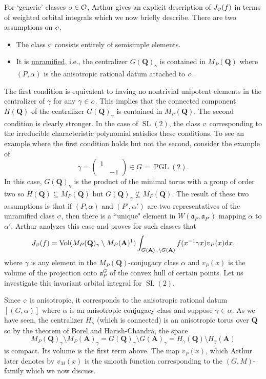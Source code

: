\documentclass[11pt]{amsart}
\def\A{\mathbf A}
\def\Q{\mathbf Q}
\def\O{\mathcal O}
\def\o{\scalebox{0.8}{$\scriptstyle\mathcal{O}$}}
\def\aaa{\mathfrak a}
\def\cb#1{{\color{black}#1}}
\def\d{\text d}
\def\bs{\setminus} 			%
\def\sl{\operatorname{SL}}
\def\vol{\operatorname{Vol}}
\theoremstyle{remark}
\begin{document}
For `generic' classes $\o \in \O$, Arthur gives an explicit description of $J_{\o}(f)$ in terms of weighted orbital integrals which we now briefly describe. There are two assumptions on $\o$. 
\begin{itemize}
	\item The class $\o$ consists entirely of semisimple elements. 
	\item It is \underline{unramified}, i.e., the centralizer $G(\Q)_\gamma$ is contained in $M_P(\Q)$ where $(P, \alpha)$ is the anisotropic rational datum attached to $\o$. 
\end{itemize}
The first condition is equivalent to having no nontrivial unipotent elements in the centralizer of $\gamma$ for any $\gamma \in \o$. This implies that the connected component $H(\Q)$ of the centralizer $G(\Q)_\gamma$ is contained in $M_P(\Q)$. The second condition is clearly stronger. 
\cb{
In the case of $\sl(2)$, the class $\o$ corresponding to the irreducible characteristic polynomial satisfies these conditions. To see an example where the first condition holds but not the second, consider the example of 
\[ \gamma = \begin{pmatrix} 1 & \\ & -1 \end{pmatrix} \in G = \operatorname{PGL}(2). \]
In this case, $G(\Q)_\gamma$ is the product of the minimal torus with a group of order two so $H(\Q) \subseteq M_P(\Q)$ but $G(\Q)_\gamma \not\subseteq M_P(\Q)$. 
}
The result of these two assumptions is that if $(P, \alpha)$ and $(P', \alpha')$ are two representatives of the unramified class $\o$, then there is a ``unique" element in $W(\aaa_P, \aaa_{P'})$ mapping $\alpha$ to $\alpha'$. Arthur analyzes this case and proves for such classes that
\begin{equation} \label{jo_anis}
	J_{\o}(f) = \vol(M_P(\Q)_\gamma \bs M_P(\A)^1) \int_{G(\A)_\gamma \bs G(\A)} f(x^{-1} \gamma x) v_P(x) \d x, 
\end{equation}
where $\gamma$ is any element in the $M_P(\Q)$-conjugacy class $\alpha$ and $v_P(x)$ is the volume of the projection onto $\aaa_P^G$ of the convex hull of certain points. Let us investigate this invariant orbital integral for $\sl(2)$. 

\cb{
Since $\o$ is anisotropic, it corresponds to the anisotropic rational datum $[(G, \alpha)]$ where $\alpha$ is an anisotropic conjugacy class and suppose $\gamma \in \alpha$. As we have seen, the centralizer $H_\gamma$ (which is connected) is an anisotropic torus over $\Q$ so by the theorem of Borel and Harish-Chandra, the space
\[ M_P(\Q)_\gamma\bs M_P(\A)_\gamma = G(\Q)_\gamma \bs G(\A)_\gamma = H_\gamma(\Q)\bs H_\gamma(\A) \]
is compact. Its volume is the first term above. The map $v_P(x)$, which Arthur later denotes by $v_M(x)$ is the smooth function corresponding to the $(G, M)$-family which we now discuss. }
\end{document}
